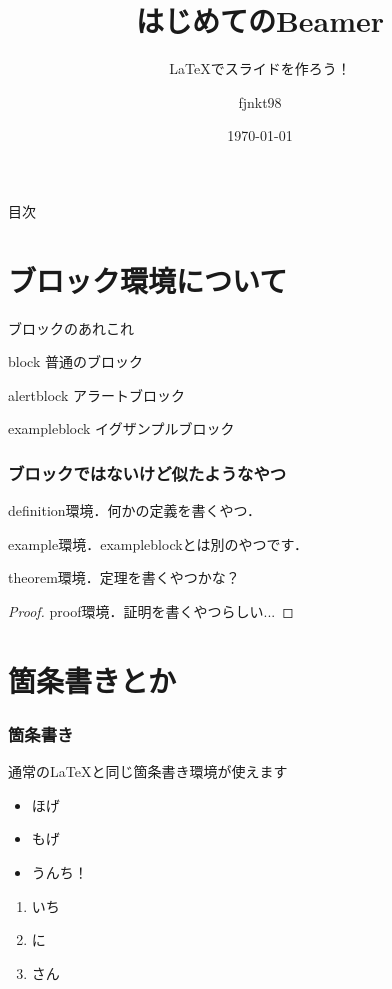 \documentclass[dvipdfmx, 12pt]{beamer}  %
\title{はじめてのBeamer}
\subtitle{LaTeXでスライドを作ろう！}
\author{fjnkt98}
\date{\today}
\institute{National Institute of Technologie, Ichinoseki College}
\begin{document}
  \maketitle

  \begin{frame}{目次}
    \tableofcontents
  \end{frame}

  \section{ブロック環境について}

  \begin{frame}{ブロックのあれこれ}
    \begin{block}{block}
      普通のブロック
    \end{block}

    \begin{alertblock}{alertblock}
      アラートブロック
    \end{alertblock}

    \begin{exampleblock}{exampleblock}
      イグザンプルブロック
    \end{exampleblock}
  \end{frame}

  \begin{frame}
    \frametitle{ブロックではないけど似たようなやつ}
    \begin{definition}
      definition環境．何かの定義を書くやつ．
    \end{definition}

    \begin{example}
      example環境．exampleblockとは別のやつです．
    \end{example}

    \begin{theorem}
      theorem環境．定理を書くやつかな？
    \end{theorem}

    \begin{proof}
      proof環境．証明を書くやつらしい...
    \end{proof}
  \end{frame}

  \section{箇条書きとか}

  \begin{frame}
    \frametitle{箇条書き}
    通常の\LaTeX と同じ箇条書き環境が使えます
    \begin{itemize}
      \item ほげ
      \item もげ
      \item うんち！
    \end{itemize}

    \begin{enumerate}
      \item いち
      \item に
      \item さん
    \end{enumerate}
  \end{frame}
\end{document}
